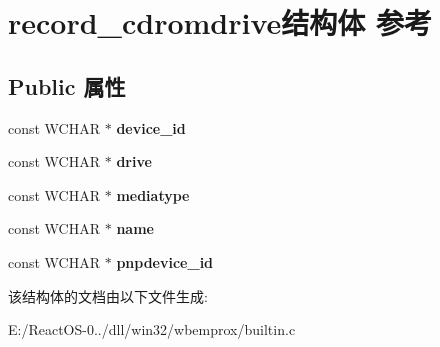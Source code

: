 \hypertarget{structrecord__cdromdrive}{}\section{record\+\_\+cdromdrive结构体 参考}
\label{structrecord__cdromdrive}
\subsection*{Public 属性}
\begin{DoxyCompactItemize}
\item 
\mbox{\label{structrecord__cdromdrive_a7450be565e45536cabe51759921cb163}} 
const W\+C\+H\+AR $\ast$ {\bfseries device\+\_\+id}
\item 
\mbox{\label{structrecord__cdromdrive_a1ed127417d52a253793c8e70bd3af1ff}} 
const W\+C\+H\+AR $\ast$ {\bfseries drive}
\item 
\mbox{\label{structrecord__cdromdrive_abf93ab43166db5b838151f95c69786af}} 
const W\+C\+H\+AR $\ast$ {\bfseries mediatype}
\item 
\mbox{\label{structrecord__cdromdrive_a24a14e0d183ace86a4a5cce7ab3a1f99}} 
const W\+C\+H\+AR $\ast$ {\bfseries name}
\item 
\mbox{\label{structrecord__cdromdrive_aaca6b3679dff07ee1b00fd40a9ea8b60}} 
const W\+C\+H\+AR $\ast$ {\bfseries pnpdevice\+\_\+id}
\end{DoxyCompactItemize}


该结构体的文档由以下文件生成\+:\begin{DoxyCompactItemize}
\item 
E\+:/\+React\+O\+S-\/0../dll/win32/wbemprox/builtin.\+c\end{DoxyCompactItemize}
